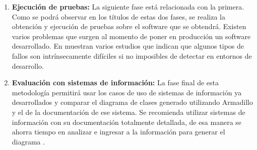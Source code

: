 \begin{enumerate}
	\item \textbf{Ejecución de pruebas:} La siguiente fase está relacionada con la primera. Como se podrá observar en los títulos de estas dos fases, se realiza la obtención y ejecución de pruebas sobre el software que se obtendrá. Existen varios problemas que surgen al momento de poner en producción un software desarrollado. En \cite{Gazzola2022} muestran varios estudios que indican que algunos tipos de fallos son intrínsecamente difíciles si no imposibles de detectar en entornos de desarrollo.
	
	
	\item \textbf{Evaluación con sistemas de información:} La fase final de esta metodología permitirá usar los casos de uso de sistemas de información ya desarrollados y comparar el diagrama de clases generado utilizando Armadillo y el de la documentación de ese sistema. Se recomienda utilizar sistemas de información con su documentación totalmente detallada, de esa manera se ahorra tiempo en analizar e ingresar a la información para generar el diagrama \cite{Whiting2022}.
	
	
\end{enumerate}


	
